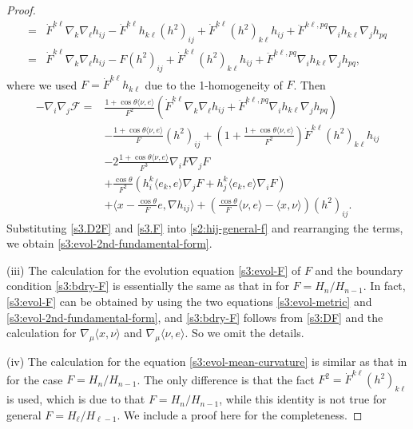 \documentclass[11pt,reqno]{amsart}
\theoremstyle{definition}
\theoremstyle{remark}
\numberwithin{equation}{section}
\renewcommand{\(}{\left(}
\renewcommand{\)}{\right)}
\renewcommand{\-}{\overline}
\renewcommand{\t}{\theta}
\begin{document}
\begin{proof}
\begin{align*}
	=&\dot{F}^{k\ell}\nabla_k\nabla_\ell h_{ij}-\dot{F}^{k\ell}h_{k\ell}(h^2)_{ij}+\dot{F}^{k\ell}(h^2)_{k\ell}h_{ij}+\ddot{F}^{k\ell,pq}\nabla_i h_{k\ell}\nabla_j h_{pq} \nonumber\\
	=&\dot{F}^{k\ell}\nabla_k \nabla_\ell h_{ij}-F(h^2)_{ij}+\dot{F}^{k\ell}(h^2)_{k\ell}h_{ij}+\ddot{F}^{k\ell,pq}\nabla_i h_{k\ell}\nabla_j h_{pq},
	\end{align*}
	where we used $F=\dot{F}^{k\ell}h_{k\ell}$ due to the 1-homogeneity of $F$. Then
\begin{align}\label{s3.D2F}
 -\nabla_i \nabla_j\mathcal{F}  = & \frac{1+\cos\t\langle \nu,e\rangle}{F^2}\left(\dot{F}^{k\ell}\nabla_k \nabla_\ell h_{ij}+\ddot{F}^{k\ell,pq}\nabla_i h_{k\ell}\nabla_j h_{pq}\right)\nonumber\\
 &-\frac{1+\cos\t\langle \nu,e\rangle}{F}(h^2)_{ij}+\left(1+\frac{1+\cos\t\langle \nu,e\rangle}{F^2}\right)\dot{F}^{k\ell}(h^2)_{k\ell}h_{ij}\nonumber\\
 &-2\frac{1+\cos\t\langle \nu,e\rangle}{F^3}\nabla_iF \nabla_jF\nonumber\\
 &+\frac{\cos\theta}{F^2}\left(h_i^k\langle e_k,e\rangle \nabla_jF+h_j^k\langle e_k,e\rangle \nabla_iF\right)\nonumber\\
  &+\langle x-\frac{\cos\theta}{F}e, \nabla h_{ij}\rangle +\left(\frac{\cos\theta}{F}\langle \nu,e\rangle- \langle x,\nu\rangle\right)(h^2)_{ij}.
\end{align}
Substituting \eqref{s3.D2F} and \eqref{s3.F} into \eqref{s2:hij-general-f} and rearranging the terms,  we obtain \eqref{s3:evol-2nd-fundamental-form}.
	
	(iii) The calculation for the evolution equation \eqref{s3:evol-F} of $F$ and the boundary condition \eqref{s3:bdry-F} is essentially the same as that in \cite[Proposition 4.3]{Wang-Weng-Xia2022} for $F=H_n/{H_{n-1}}$.  In fact, \eqref{s3:evol-F} can be obtained by using the two equations \eqref{s3:evol-metric} and \eqref{s3:evol-2nd-fundamental-form}, and \eqref{s3:bdry-F} follows from \eqref{s3:DF} and the calculation for $\nabla_\mu\langle x,\nu\rangle$ and $\nabla_\mu\langle \nu,e\rangle$.  So we omit the details.

	(iv) The calculation for the equation \eqref{s3:evol-mean-curvature} is similar as that in  \cite[Proposition 4.4]{Wang-Weng-Xia2022} for the case $F=H_n/{H_{n-1}}$. The only difference is that the fact $F^2=\dot{F}^{k\ell}(h^2)_{k\ell}$ is used, which is due to that $F=H_n/{H_{n-1}}$, while this identity is not true for general $F=H_\ell/H_{\ell-1}$. We include a proof here for the completeness.


\end{proof}
\end{document}
